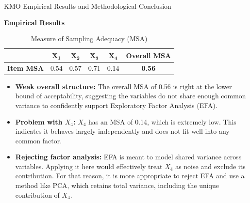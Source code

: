 \documentclass[8pt, aspectratio=169]{beamer}
\begin{document}
\begin{frame}{KMO Empirical Results and Methodological Conclusion}

\textbf{Empirical Results}
\begin{table}[]
    \centering
    \footnotesize
    \caption{Measure of Sampling Adequacy (MSA)}
    \begin{tabular}{lcccc|c}
        \toprule
         & $\mathbf{X_1}$ & $\mathbf{X_2}$ & $\mathbf{X_3}$ & $\mathbf{X_4}$ & \textbf{Overall MSA} \\
        \midrule
        \textbf{Item MSA} & 0.54 & 0.57 & 0.71 & 0.14 & \textbf{0.56} \\
        \bottomrule
    \end{tabular}
\end{table}

\vspace{0.1cm}
\begin{itemize}
    \item \textbf{Weak overall structure:} The overall MSA of 0.56 is right at the lower bound of acceptability, suggesting the variables do not share enough common variance to confidently support Exploratory Factor Analysis (EFA).
    
    \item \textbf{Problem with $X_4$:} $X_4$ has an MSA of 0.14, which is extremely low. This indicates it behaves largely independently and does not fit well into any common factor.
    
    \item \textbf{Rejecting factor analysis:} EFA is meant to model shared variance across variables. Applying it here would effectively treat $X_4$ as noise and exclude its contribution. For that reason, it is more appropriate to reject EFA and use a method like PCA, which retains total variance, including the unique contribution of $X_4$.
\end{itemize}

\end{frame}
\end{document}
